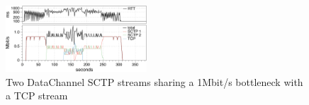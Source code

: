 \documentclass{sig-alternate}
\begin{document}
\begin{figure}[t]
  \centering
    \includegraphics[width=0.47\textwidth]{figs/2sctp_tcp}
\vspace*{-0.38cm}
	\caption{Two DataChannel SCTP  streams sharing a 1Mbit/s bottleneck with a TCP stream} \label{fig:2sctp_tcp}
\vspace*{-0.4cm}
\end{figure}



\end{document}
